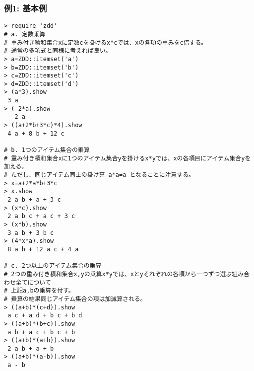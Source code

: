 \subsubsection*{例1: 基本例}



\begin{Verbatim}[baselinestretch=0.7,frame=single]
> require 'zdd'
# a. 定数乗算
# 重み付き積和集合xに定数cを掛けるx*cでは、xの各項の重みをc倍する。
# 通常の多項式と同様に考えれば良い。
> a=ZDD::itemset('a')
> b=ZDD::itemset('b')
> c=ZDD::itemset('c')
> d=ZDD::itemset('d')
> (a*3).show
 3 a
> (-2*a).show
 - 2 a
> ((a+2*b+3*c)*4).show
 4 a + 8 b + 12 c

# b. 1つのアイテム集合の乗算
# 重み付き積和集合xに1つのアイテム集合yを掛けるx*yでは、xの各項目にアイテム集合yを加える。
# ただし、同じアイテム同士の掛け算 a*a=a となることに注意する。
> x=a+2*a*b+3*c
> x.show
 2 a b + a + 3 c
> (x*c).show
 2 a b c + a c + 3 c
> (x*b).show
 3 a b + 3 b c
> (4*x*a).show
 8 a b + 12 a c + 4 a

# c. 2つ以上のアイテム集合の乗算
# 2つの重み付き積和集合x,yの乗算x*yでは、xとyそれぞれの各項から一つずつ選ぶ組み合わせ全てについて
# 上記a,bの乗算を付す。
# 乗算の結果同じアイテム集合の項は加減算される。
> ((a+b)*(c+d)).show
 a c + a d + b c + b d
> ((a+b)*(b+c)).show
 a b + a c + b c + b
> ((a+b)*(a+b)).show
 2 a b + a + b
> ((a+b)*(a-b)).show
 a - b
\end{Verbatim}
